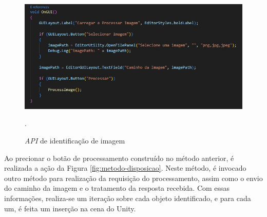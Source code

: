 \begin{figure}[!h]
    \centering
    \begin{minipage}{0.7\linewidth}
    \centering
    \captionsetup{justification=centering,margin=0.5cm,font=small}
    \includegraphics[width=1\linewidth]{img/cap5/gui-codigo.jpeg}
    \caption{\textit{API} de identificação de imagem}.
    \label{fig:metodo-gui}
    \end{minipage}
\end{figure}

Ao precionar o botão de processamento construído no método anterior, é realizada a ação da Figura \ref{fig:metodo-disposicao}. Neste método, é invocado outro método para realização da requisição do processamento, assim como o envio do caminho da imagem e o tratamento da resposta recebida. Com essas informações, realiza-se um iteração sobre cada objeto identificado, e para cada um, é feita um inserção na cena do Unity.

